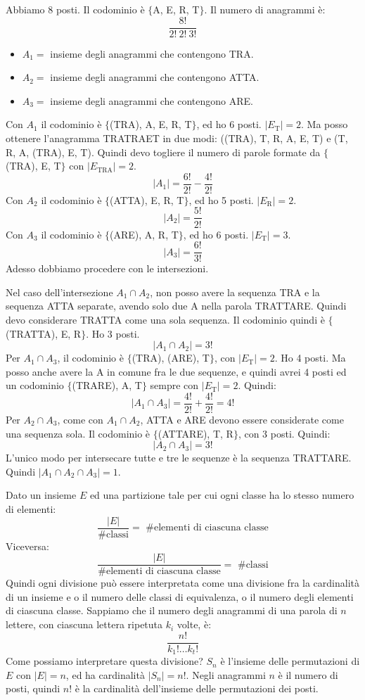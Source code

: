 Abbiamo 8 posti. Il codominio \`e $\{$A, E, R, T$\}$. Il numero di anagrammi \`e:
\[
\frac{8!}{2! \ 2! \ 3!}
\]
\begin{itemize}
  \item $A_1 = $ insieme degli anagrammi che contengono TRA. 
  \item $A_2 = $ insieme degli anagrammi che contengono ATTA. 
  \item $A_3 = $ insieme degli anagrammi che contengono ARE. 
\end{itemize}
Con $A_1$ il codominio \`e $\{ $(TRA), A, E, R, T$\}$, ed ho 6 posti. $|E_{\text{T}}| = 2$. Ma posso ottenere l'anagramma TRATRAET in due modi: ((TRA), T, R, A, E, T) e (T, R, A, (TRA), E, T). Quindi devo togliere il numero di parole formate da $\{ $(TRA), E, T$\}$ con $|E_{\text{TRA}}| = 2$.
\[
|A_1| = \frac{6!}{2!} - \frac{4!}{2!}
\]
Con $A_2$ il codominio \`e $\{ $(ATTA), E, R, T$\}$, ed ho 5 posti. $|E_{\text{R}}| = 2$.
\[
|A_2| = \frac{5!}{2!}
\]
Con $A_3$ il codominio \`e $\{ $(ARE), A, R, T$\}$, ed ho 6 posti. $|E_{\text{T}}| = 3$.
\[
|A_3| = \frac{6!}{3!}
\]
Adesso dobbiamo procedere con le intersezioni.

Nel caso dell'intersezione $A_1 \cap A_2$, non posso avere la sequenza TRA e la sequenza ATTA separate, avendo solo due A nella parola TRATTARE. Quindi devo considerare TRATTA come una sola sequenza. Il codominio quindi \`e $\{ $(TRATTA), E, R$\}$. Ho 3 posti.
\[
|A_1 \cap A_2| = 3!
\] 
Per $A_1 \cap A_3$, il codominio \`e $\{ $(TRA), (ARE), T$\}$, con $|E_{\text{T}}| = 2$. Ho 4 posti. Ma posso anche avere la A in comune fra le due sequenze, e quindi avrei 4 posti ed un codominio $\{ $(TRARE), A, T$\}$ sempre con $|E_{\text{T}}| = 2$. Quindi:
\[
|A_1 \cap A_3| = \frac{4!}{2!} + \frac{4!}{2!} = 4!
\]
Per $A_2 \cap A_3$, come con $A_1 \cap A_2$, ATTA e ARE devono essere considerate come una sequenza sola. Il codominio \`e $\{$(ATTARE), T, R$\}$, con 3 posti. Quindi:
\[
|A_2 \cap A_3| = 3!
\]
L'unico modo per intersecare tutte e tre le sequenze \`e la sequenza TRATTARE. Quindi $|A_1 \cap A_2 \cap A_3| = 1$.


Dato un insieme $E$ ed una partizione tale per cui ogni classe ha lo stesso numero di elementi:
\[
\frac{|E|}{\text{\# classi}} = \text{ \# elementi di ciascuna classe}
\]
Viceversa:
\[
\frac{|E|}{\text{\# elementi di ciascuna classe}} = \text{ \# classi}
\]
Quindi ogni divisione pu\`o essere interpretata come una divisione fra la cardinalit\`a di un insieme e o il numero delle classi di equivalenza, o il numero degli elementi di ciascuna classe. Sappiamo che il numero degli anagrammi di una parola di $n$ lettere, con ciascuna lettera ripetuta $k_i$ volte, \`e:
\[
\frac{n!}{k_1! \dots k_t!}
\]
Come possiamo interpretare questa divisione? $S_n$ \`e l'insieme delle permutazioni di $E$ con $|E| = n$, ed ha cardinalit\`a $|S_n| = n!$. Negli anagrammi $n$ \`e il numero di posti, quindi $n!$ \`e la cardinalit\`a dell'insieme delle permutazioni dei posti. 

